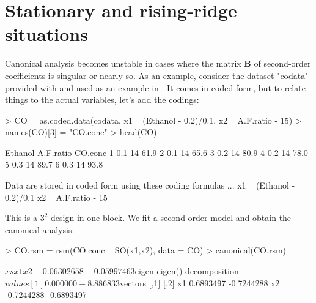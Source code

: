 \documentclass[article,nojss]{jss}
\def\rsm{\pkg{rsm}}
\def\bB{\mathbf{B}}
\begin{document}
\section{Stationary and rising-ridge situations}
Canonical analysis becomes unstable in cases where the matrix $\bB$ of second-order coefficients is singular or nearly so. As an example, consider the dataset "codata" provided with \rsm{} and used as an example in \cite{Box05}. It comes in coded form, but to relate things to the actual variables, let's add the codings:
\begin{Schunk}
\begin{Sinput}
> CO = as.coded.data(codata,  x1 ~ (Ethanol - 0.2)/0.1,  x2 ~ A.F.ratio - 15)
> names(CO)[3] = "CO.conc"
> head(CO)
\end{Sinput}
\begin{Soutput}
  Ethanol A.F.ratio CO.conc
1     0.1        14    61.9
2     0.1        14    65.6
3     0.2        14    80.9
4     0.2        14    78.0
5     0.3        14    89.7
6     0.3        14    93.8

Data are stored in coded form using these coding formulas ...
x1 ~ (Ethanol - 0.2)/0.1
x2 ~ A.F.ratio - 15
\end{Soutput}
\end{Schunk}
This is a $3^2$ design in one block. We fit a second-order model and obtain the canonical analysis:
\begin{Schunk}
\begin{Sinput}
> CO.rsm = rsm(CO.conc ~ SO(x1,x2), data = CO)
> canonical(CO.rsm)
\end{Sinput}
\begin{Soutput}
$xs
         x1          x2 
-0.06302658 -0.05997463 

$eigen
eigen() decomposition
$values
[1]  0.000000 -8.886833

$vectors
         [,1]       [,2]
x1  0.6893497 -0.7244288
x2 -0.7244288 -0.6893497
\end{Soutput}
\end{Schunk}
%
\end{document}
